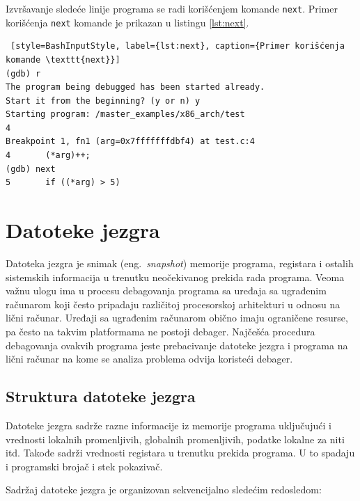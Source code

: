 \documentclass[12pt,oneside]{memoir}
\begin{document}
\begin{description}
Izvršavanje sledeće linije programa se radi korišćenjem komande \texttt{next}. Primer korišćenja \texttt{next} komande je prikazan u listingu \ref{lst:next}.

\begin{lstlisting} [style=BashInputStyle, label={lst:next}, caption={Primer korišćenja komande \texttt{next}}]
(gdb) r
The program being debugged has been started already.
Start it from the beginning? (y or n) y
Starting program: /master_examples/x86_arch/test 
4
Breakpoint 1, fn1 (arg=0x7fffffffdbf4) at test.c:4
4		(*arg)++;
(gdb) next
5	    if ((*arg) > 5)
\end{lstlisting}

\end{description}


\section{Datoteke jezgra}

Datoteka jezgra je snimak (eng.~\emph{snapshot}) memorije programa, registara i ostalih sistemskih informacija u trenutku neočekivanog prekida rada programa. Veoma važnu ulogu ima u procesu debagovanja programa sa uređaja sa ugrađenim računarom koji često pripadaju različitoj procesorskoj arhitekturi u odnosu na lični računar. Uređaji sa ugrađenim računarom obično imaju ograničene resurse, pa često na takvim platformama ne postoji debager. Najčešća procedura debagovanja ovakvih programa jeste prebacivanje datoteke jezgra i programa na lični računar na kome se analiza problema odvija koristeći debager.

\subsection{Struktura datoteke jezgra}

Datoteke jezgra sadrže razne informacije iz memorije programa uključujući i vrednosti lokalnih promenljivih, globalnih promenljivih, podatke lokalne za niti itd. Takođe sadrži vrednosti registara u trenutku prekida programa. U to spadaju i programski brojač i stek pokazivač.

Sadržaj datoteke jezgra je organizovan sekvencijalno sledećim redosledom:
\end{document}
